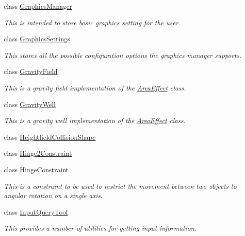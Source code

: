 \begin{DoxyCompactItemize}
class \hyperlink{classMezzanine_1_1GraphicsManager}{GraphicsManager}
\begin{DoxyCompactList}\small\item\em This is intended to store basic graphics setting for the user. \item\end{DoxyCompactList}\item 
class \hyperlink{structMezzanine_1_1GraphicsSettings}{GraphicsSettings}
\begin{DoxyCompactList}\small\item\em This stores all the possible configuration options the graphics manager supports. \item\end{DoxyCompactList}\item 
class \hyperlink{classMezzanine_1_1GravityField}{GravityField}
\begin{DoxyCompactList}\small\item\em This is a gravity field implementation of the \hyperlink{classMezzanine_1_1AreaEffect}{AreaEffect} class. \item\end{DoxyCompactList}\item 
class \hyperlink{classMezzanine_1_1GravityWell}{GravityWell}
\begin{DoxyCompactList}\small\item\em This is a gravity well implementation of the \hyperlink{classMezzanine_1_1AreaEffect}{AreaEffect} class. \item\end{DoxyCompactList}\item 
class \hyperlink{classMezzanine_1_1HeightfieldCollisionShape}{HeightfieldCollisionShape}
\item 
class \hyperlink{classMezzanine_1_1Hinge2Constraint}{Hinge2Constraint}
\item 
class \hyperlink{classMezzanine_1_1HingeConstraint}{HingeConstraint}
\begin{DoxyCompactList}\small\item\em This is a constraint to be used to restrict the movement between two objects to angular rotation on a single axis. \item\end{DoxyCompactList}\item 
class \hyperlink{classMezzanine_1_1InputQueryTool}{InputQueryTool}
\begin{DoxyCompactList}\small\item\em This provides a number of utilities for getting input information. \item\end{DoxyCompactList}\item 

\end{DoxyCompactItemize}
